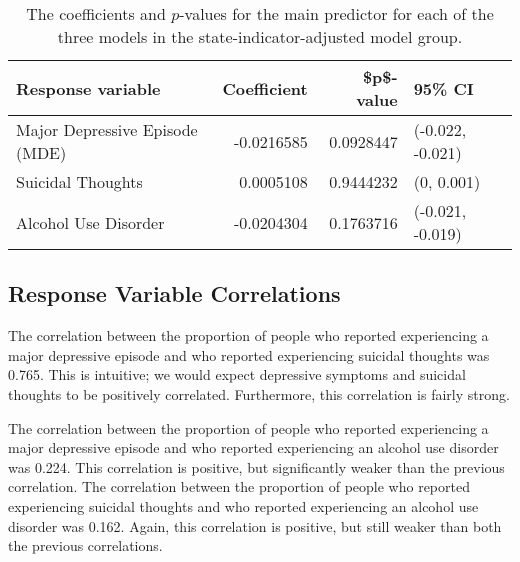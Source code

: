 \documentclass{article}
\begin{document}
\begin{table}[!htb]
\begin{center}
\begin{tabular}{l|r|r|l}
    \hline
    Response variable & Coefficient & \$p\$-value & 95\% CI\\
    \hline
    Major Depressive Episode (MDE) & -0.0216585 & 0.0928447 & (-0.022, -0.021)\\
    \hline
    Suicidal Thoughts & 0.0005108 & 0.9444232 & (0, 0.001)\\
    \hline
    Alcohol Use Disorder & -0.0204304 & 0.1763716 & (-0.021, -0.019)\\
    \hline
\end{tabular}
\caption{\label{tab:median-income-model-results} The coefficients and $p$-values
    for the main predictor for each of the three models
    in the state-indicator-adjusted model group.
}
\end{center}
\end{table}

\subsection{Response Variable Correlations}

The correlation between the proportion of people who reported experiencing
a major depressive episode and
who reported experiencing suicidal thoughts was
0.765.
This is intuitive; we would expect depressive symptoms and suicidal thoughts
to be positively correlated.
Furthermore, this correlation is fairly strong.

The correlation between the proportion of people who reported experiencing
a major depressive episode and
who reported experiencing an alcohol use disorder was
0.224.
This correlation is positive, but significantly weaker than
the previous correlation.
The correlation between the proportion of people who reported experiencing
suicidal thoughts and
who reported experiencing an alcohol use disorder was
0.162.
Again, this correlation is positive, but still weaker than
both the previous correlations.
\end{document}
